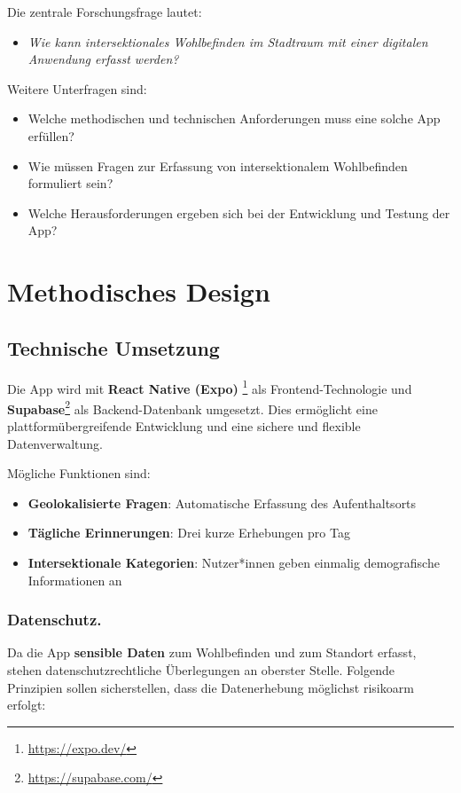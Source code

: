 \documentclass{template}
\begin{document}
Die zentrale Forschungsfrage lautet:
\begin{itemize}
    \item \emph{Wie kann intersektionales Wohlbefinden im Stadtraum mit einer digitalen Anwendung erfasst werden?}
\end{itemize}

Weitere Unterfragen sind:
\begin{itemize}
    \item Welche methodischen und technischen Anforderungen muss eine solche App erfüllen?
    \item Wie müssen Fragen zur Erfassung von intersektionalem Wohlbefinden formuliert sein?
    \item Welche Herausforderungen ergeben sich bei der Entwicklung und Testung der App?
\end{itemize}

\section{Methodisches Design}
\subsection{Technische Umsetzung}
Die App wird mit \textbf{React Native (Expo)} \footnote{\href{https://expo.dev/}{https://expo.dev/}} als Frontend-Technologie und \textbf{Supabase}\footnote{\href{https://supabase.com/}{https://supabase.com/}} als Backend-Datenbank umgesetzt. Dies ermöglicht eine plattformübergreifende Entwicklung und eine sichere und flexible Datenverwaltung.

Mögliche Funktionen sind:
\begin{itemize}
    \item \textbf{Geolokalisierte Fragen}: Automatische Erfassung des Aufenthaltsorts
    \item \textbf{Tägliche Erinnerungen}: Drei kurze Erhebungen pro Tag
    \item \textbf{Intersektionale Kategorien}: Nutzer*innen geben einmalig demografische Informationen an
\end{itemize}

\subsubsection{Datenschutz.}
Da die App \textbf{sensible Daten} zum Wohlbefinden und zum Standort erfasst, stehen datenschutzrechtliche Überlegungen an oberster Stelle. Folgende Prinzipien sollen sicherstellen, dass die Datenerhebung möglichst risikoarm erfolgt:
\end{document}
